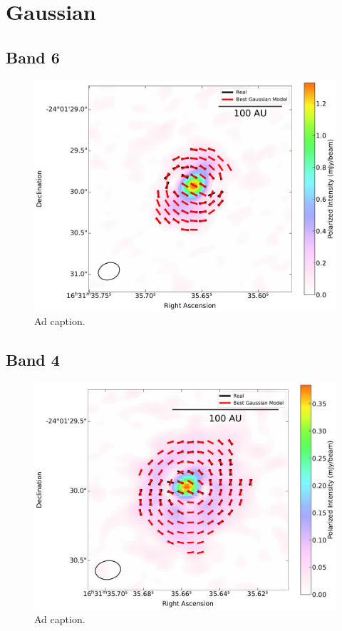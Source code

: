 \chapter{Gaussian}
\label{ch5}


\section{Band 6}
\begin{figure}[h]
  \centering
  \includegraphics[width=2\textwidth]{WRITEUP_AND_IMAGES/IMAGES/IRS63_best_gaussian_BAND6.pdf}
  \caption{Ad caption.}
  \label{fig: }
\end{figure}



\section{Band 4}
\begin{figure}[h]
  \centering
  \includegraphics[width=2\textwidth]{WRITEUP_AND_IMAGES/IMAGES/IRS63_best_gaussian_BAND4.pdf}
  \caption{Ad caption.}
  \label{fig: }
\end{figure}
